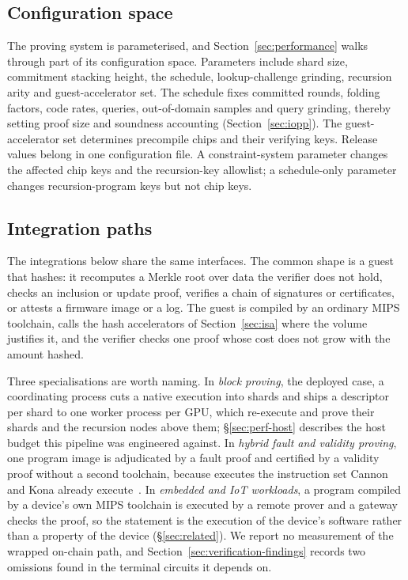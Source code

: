 \subsection{Configuration space}
\label{sec:ipcore-config}

The proving system is parameterised, and Section~\ref{sec:performance} walks through part of its configuration space. Parameters include shard size, commitment stacking height, the \WHIR{} schedule, lookup-challenge grinding, recursion arity and guest-accelerator set. The \WHIR{} schedule fixes committed rounds, folding factors, code rates, queries, out-of-domain samples and query grinding, thereby setting proof size and soundness accounting (Section~\ref{sec:iopp}). The guest-accelerator set determines precompile chips and their verifying keys. Release values belong in one configuration file. A constraint-system parameter changes the affected chip keys and the recursion-key allowlist; a schedule-only parameter changes recursion-program keys but not chip keys.

\subsection{Integration paths}
\label{sec:ipcore-integration}

The integrations below share the same interfaces. The common shape is a guest that hashes: it recomputes a Merkle root over data the verifier does not hold, checks an inclusion or update proof, verifies a chain of signatures or certificates, or attests a firmware image or a log. The guest is compiled by an ordinary MIPS toolchain, calls the hash accelerators of Section~\ref{sec:isa} where the volume justifies it, and the verifier checks one proof whose cost does not grow with the amount hashed.

Three specialisations are worth naming. In \emph{block proving}, the deployed case, a coordinating process cuts a native execution into shards and ships a descriptor per shard to one worker process per GPU, which re-execute and prove their shards and the recursion nodes above them; \S\ref{sec:perf-host} describes the host budget this pipeline was engineered against. In \emph{hybrid fault and validity proving}, one program image is adjudicated by a fault proof and certified by a validity proof without a second toolchain, because \Ziren{} executes the instruction set Cannon and Kona already execute~\citep{cannon,kona}. In \emph{embedded and IoT workloads}, a program compiled by a device's own MIPS toolchain is executed by a remote prover and a gateway checks the proof, so the statement is the execution of the device's software rather than a property of the device (\S\ref{sec:related}). We report no measurement of the wrapped on-chain path, and Section~\ref{sec:verification-findings} records two omissions found in the terminal circuits it depends on.

